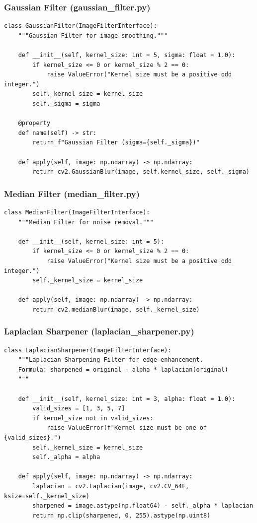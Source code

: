 \documentclass[a4paper,12pt]{article}
\begin{document}
\subsubsection*{Gaussian Filter (gaussian\_filter.py)}
\begin{lstlisting}
class GaussianFilter(ImageFilterInterface):
    """Gaussian Filter for image smoothing."""

    def __init__(self, kernel_size: int = 5, sigma: float = 1.0):
        if kernel_size <= 0 or kernel_size % 2 == 0:
            raise ValueError("Kernel size must be a positive odd integer.")
        self._kernel_size = kernel_size
        self._sigma = sigma

    @property
    def name(self) -> str:
        return f"Gaussian Filter (sigma={self._sigma})"

    def apply(self, image: np.ndarray) -> np.ndarray:
        return cv2.GaussianBlur(image, self.kernel_size, self._sigma)
\end{lstlisting}

\subsubsection*{Median Filter (median\_filter.py)}
\begin{lstlisting}
class MedianFilter(ImageFilterInterface):
    """Median Filter for noise removal."""

    def __init__(self, kernel_size: int = 5):
        if kernel_size <= 0 or kernel_size % 2 == 0:
            raise ValueError("Kernel size must be a positive odd integer.")
        self._kernel_size = kernel_size

    def apply(self, image: np.ndarray) -> np.ndarray:
        return cv2.medianBlur(image, self._kernel_size)
\end{lstlisting}

\subsubsection*{Laplacian Sharpener (laplacian\_sharpener.py)}
\begin{lstlisting}
class LaplacianSharpener(ImageFilterInterface):
    """Laplacian Sharpening Filter for edge enhancement.
    Formula: sharpened = original - alpha * laplacian(original)
    """

    def __init__(self, kernel_size: int = 3, alpha: float = 1.0):
        valid_sizes = [1, 3, 5, 7]
        if kernel_size not in valid_sizes:
            raise ValueError(f"Kernel size must be one of {valid_sizes}.")
        self._kernel_size = kernel_size
        self._alpha = alpha

    def apply(self, image: np.ndarray) -> np.ndarray:
        laplacian = cv2.Laplacian(image, cv2.CV_64F, ksize=self._kernel_size)
        sharpened = image.astype(np.float64) - self._alpha * laplacian
        return np.clip(sharpened, 0, 255).astype(np.uint8)
\end{lstlisting}
\end{document}
